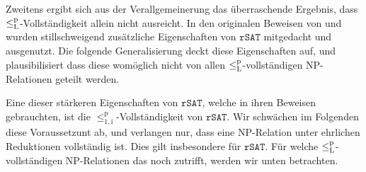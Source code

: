 Zweitens ergibt sich aus der Verallgemeinerung das überraschende Ergebnis, dass $\leq_\mathrm{L}^\mathrm{p}$-Vollständigkeit allein nicht ausreicht. In den originalen Beweisen von \citeauthor{fenner_inverting_2003} und \citeauthor{messner_simulation_2001} wurden stillschweigend zusätzliche Eigenschaften von $\mathtt{rSAT}$ mitgedacht und ausgenutzt. Die folgende Generalisierung deckt diese Eigenschaften auf, und plausibilisiert dass diese womöglich nicht von allen $\leq_\mathrm{L}^\mathrm{p}$-vollständigen NP-Relationen geteilt werden.

Eine dieser stärkeren Eigenschaften von $\mathtt{rSAT}$, welche \citeauthor{fenner_inverting_2003} in ihren Beweisen gebrauchten, ist die $\leq_\mathrm{1,i}^\mathrm p$-Vollständigkeit von $\mathtt{rSAT}$. Wir schwächen im Folgenden diese Voraussetzunt ab, und verlangen nur, dass eine NP-Relation unter ehrlichen Reduktionen vollständig ist. Dies gilt insbesondere für $\mathtt{rSAT}$.
Für welche $\leq_\mathrm{L}^\mathrm{p}$-vollständigen NP-Relationen das noch zutrifft, werden wir unten betrachten.

